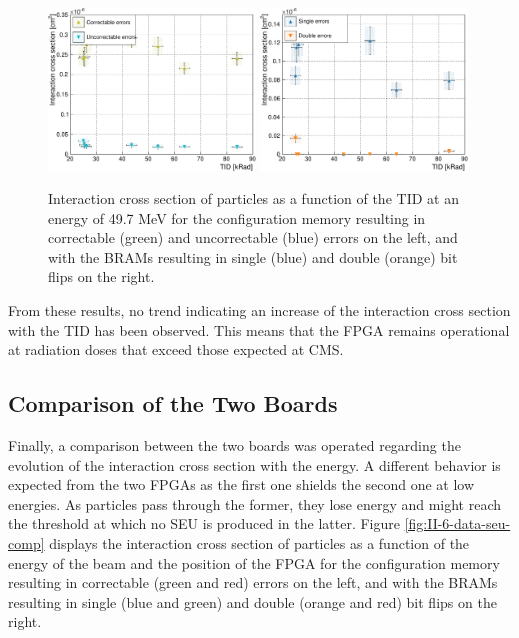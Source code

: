       \begin{figure}[h!]
        \centering
        \includegraphics[width=0.49\textwidth]{img/plots/cDose_SEM-crop}
        \includegraphics[width=0.49\textwidth]{img/plots/cDose_BRAM-crop}
        \caption{Interaction cross section of particles as a function of the TID at an energy of 49.7 MeV for the configuration memory resulting in correctable (green) and uncorrectable (blue) errors on the left, and with the BRAMs resulting in single (blue) and double (orange) bit flips on the right.}
        \label{fig:II-6-data-seu-tid}
      \end{figure}

      From these results, no trend indicating an increase of the interaction cross section with the TID has been observed. This means that the FPGA remains operational at radiation doses that exceed those expected at CMS.

    \subsection{Comparison of the Two Boards}

      Finally, a comparison between the two boards was operated regarding the evolution of the interaction cross section with the energy. A different behavior is expected from the two FPGAs as the first one shields the second one at low energies. As particles pass through the former, they lose energy and might reach the threshold at which no SEU is produced in the latter. Figure \ref{fig:II-6-data-seu-comp} displays the interaction cross section of particles as a function of the energy of the beam and the position of the FPGA for the configuration memory resulting in correctable (green and red) errors on the left, and with the BRAMs resulting in single (blue and green) and double (orange and red) bit flips on the right. \\


